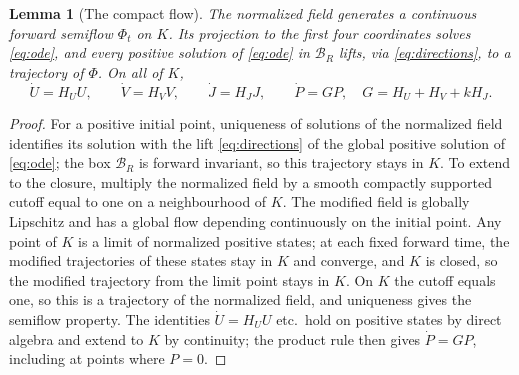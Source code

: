 \documentclass[11pt,a4paper]{article}
\theoremstyle{plain}
\newtheorem{lemma}[theorem]{Lemma}
\theoremstyle{definition}
\theoremstyle{remark}
\newcommand{\cB}{\mathcal B}
\begin{document}
\begin{lemma}[The compact flow]\label{lem:lift-flow}
The normalized field generates a continuous forward semiflow $\Phi_t$ on $K$. Its projection to the first four coordinates solves \eqref{eq:ode}, and every positive solution of \eqref{eq:ode} in $\cB_R$ lifts, via \eqref{eq:directions}, to a trajectory of $\Phi$. On all of $K$,
\begin{equation}\label{eq:product-growth}
 \dot U=H_UU,\qquad \dot V=H_VV,\qquad \dot J=H_JJ,\qquad \dot P=GP,\quad G=H_U+H_V+kH_J .
\end{equation}
\end{lemma}
\begin{proof}
For a positive initial point, uniqueness of solutions of the normalized field identifies its solution with the lift \eqref{eq:directions} of the global positive solution of \eqref{eq:ode}; the box $\cB_R$ is forward invariant, so this trajectory stays in $K$. To extend to the closure, multiply the normalized field by a smooth compactly supported cutoff equal to one on a neighbourhood of $K$. The modified field is globally Lipschitz and has a global flow depending continuously on the initial point. Any point of $K$ is a limit of normalized positive states; at each fixed forward time, the modified trajectories of these states stay in $K$ and converge, and $K$ is closed, so the modified trajectory from the limit point stays in $K$. On $K$ the cutoff equals one, so this is a trajectory of the normalized field, and uniqueness gives the semiflow property. The identities $\dot U=H_UU$ etc.\ hold on positive states by direct algebra and extend to $K$ by continuity; the product rule then gives $\dot P=GP$, including at points where $P=0$.
\end{proof}
\end{document}
